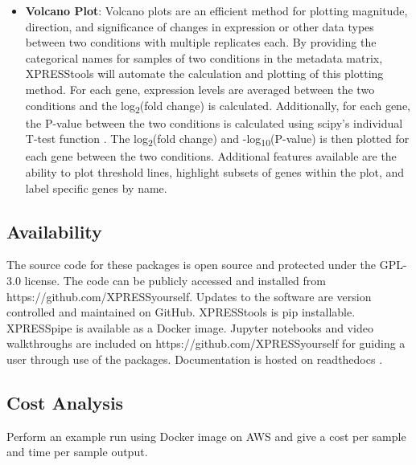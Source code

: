 \documentclass[11pt, a4paper, oneside]{article}
\begin{document}
\begin{itemize}
  \item \textbf{Volcano Plot}: Volcano plots are an efficient method for plotting magnitude, direction, and significance of changes in expression or other data types between two conditions with multiple replicates each. By providing the categorical names for samples of two conditions in the metadata matrix, XPRESStools will automate the calculation and plotting of this plotting method. For each gene, expression levels are averaged between the two conditions and the log\textsubscript{2}(fold change) is calculated. Additionally, for each gene, the P-value between the two conditions is calculated using scipy's individual T-test function \cite{scipy}. The log\textsubscript{2}(fold change) and -log\textsubscript{10}(P-value) is then plotted for each gene between the two conditions. Additional features available are the ability to plot threshold lines, highlight subsets of genes within the plot, and label specific genes by name.

\end{itemize}

\subsection{Availability}
The source code for these packages is open source and protected under the GPL-3.0 license. The code can be publicly accessed and installed from https://github.com/XPRESSyourself. Updates to the software are version controlled and maintained on GitHub. XPRESStools is pip installable. XPRESSpipe is available as a Docker image. Jupyter notebooks and video walkthroughs are included on https://github.com/XPRESSyourself for guiding a user through use of the packages. Documentation is hosted on readthedocs \cite{readthedocs}.

\subsection{Cost Analysis}
Perform an example run using Docker image on AWS and give a cost per sample and time per sample output.
\end{document}
